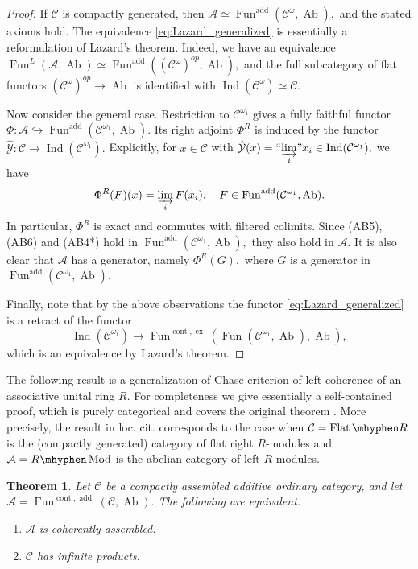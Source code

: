 \documentclass[11pt,leqno]{amsart}
\newtheorem{theo}{Theorem}[section]
\numberwithin{equation}{section}
\newcommand{\hy}{\mhyphen}
\newcommand{\indlim}[1][]{\mathop{\varinjlim}\limits_{#1}}
\newcommand{\inddlim}[1][]{{``{\indlim[#1]}"}}
\newcommand{\hto}{\hookrightarrow}
\newcommand{\Flat}{\operatorname{Flat}}
\newcommand{\cont}{\operatorname{cont}}
\newcommand{\ex}{\operatorname{ex}}
\newcommand{\cA}{{\mathcal A}}
\newcommand{\cC}{{\mathcal C}}
\newcommand{\cY}{{\mathcal Y}}
\newcommand{\Fun}{\operatorname{Fun}}
\newcommand{\Ab}{\operatorname{Ab}}
\newcommand{\add}{\operatorname{add}}
\newcommand{\Ind}{\operatorname{Ind}}
\newcommand{\Mod}{\operatorname{Mod}}
\begin{document}
\begin{proof}
If $\cC$ is compactly generated, then $\cA\simeq\Fun^{\add}(\cC^{\omega},\Ab),$ and the stated axioms hold. The equivalence \eqref{eq:Lazard_generalized} is essentially a reformulation of Lazard's theorem. Indeed, we have an equivalence $\Fun^L(\cA,\Ab)\simeq\Fun^{\add}((\cC^{\omega})^{op},\Ab),$ and the full subcategory of flat functors $(\cC^{\omega})^{op}\to \Ab$ is identified with $\Ind(\cC^{\omega})\simeq\cC.$

Now consider the general case. Restriction to $\cC^{\omega_1}$ gives a fully faithful functor $\Phi:\cA\hto \Fun^{\add}(\cC^{\omega_1},\Ab).$ Its right adjoint $\Phi^R$ is induced by the functor $\hat{\cY}:\cC\to\Ind(\cC^{\omega_1}).$ Explicitly, for $x\in\cC$ with $\hat{\cY}(x)=\inddlim[i]x_i\in\Ind(\cC^{\omega_1}),$ we have
\begin{equation*}
\Phi^R(F)(x)=\indlim[i]F(x_i),\quad F\in\Fun^{\add}(\cC^{\omega_1},\Ab).
\end{equation*}
In particular, $\Phi^R$ is exact and commutes with filtered colimits. Since (AB5), (AB6) and (AB4*) hold in $\Fun^{\add}(\cC^{\omega_1},\Ab),$ they also hold in $\cA.$ It is also clear that $\cA$ has a generator, namely $\Phi^R(G),$ where $G$ is a generator in $\Fun^{\add}(\cC^{\omega_1},\Ab).$

Finally, note that by the above observations the functor \eqref{eq:Lazard_generalized} is a retract of the functor
\begin{equation*}
\Ind(\cC^{\omega_1})\to \Fun^{\cont,\ex}(\Fun(\cC^{\omega_1},\Ab),\Ab),
\end{equation*}
which is an equivalence by Lazard's theorem.	 
\end{proof}

The following result is a generalization of Chase criterion of left coherence of an associative unital ring $R.$ For completeness we give essentially a self-contained proof, which is purely categorical and covers the original theorem \cite[Theorem 2.1]{Ch60}. More precisely, the result in loc. cit. corresponds to the case when $\cC=\Flat\hy R$ is the (compactly generated) category of flat right $R$-modules and $\cA=R\hy\Mod$ is the abelian category of left $R$-modules.

\begin{theo}\label{th:Chase}
Let $\cC$ be a compactly assembled additive ordinary category, and let $\cA=\Fun^{\cont,\add}(\cC,\Ab).$ The following are equivalent.
\begin{enumerate}[label=(\roman*),ref=(\roman*)]
	\item $\cA$ is coherently assembled. \label{Chase_coherently_assembled}
	\item $\cC$ has infinite products. \label{Chase_products_of_flat}
\end{enumerate}
\end{theo}
\end{document}
